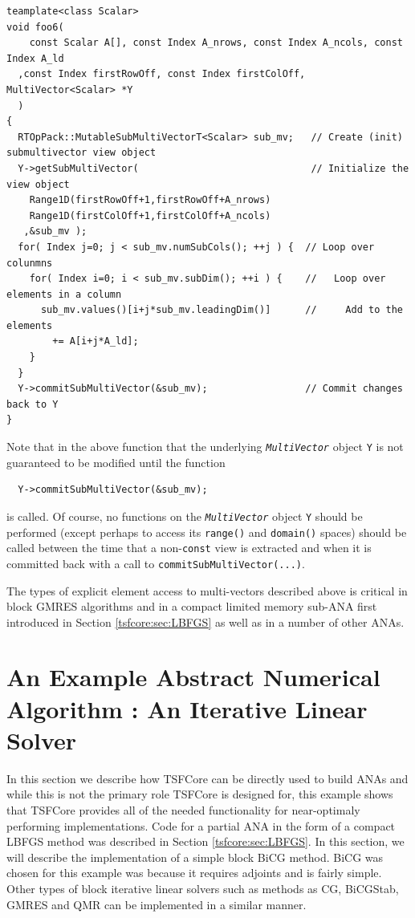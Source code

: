 {\scriptsize\begin{verbatim}
teamplate<class Scalar>
void foo6(
	const Scalar A[], const Index A_nrows, const Index A_ncols, const Index A_ld
  ,const Index firstRowOff, const Index firstColOff, MultiVector<Scalar> *Y
  )
{
  RTOpPack::MutableSubMultiVectorT<Scalar> sub_mv;   // Create (init) submultivector view object
  Y->getSubMultiVector(                              // Initialize the view object
    Range1D(firstRowOff+1,firstRowOff+A_nrows)
    Range1D(firstColOff+1,firstColOff+A_ncols)
   ,&sub_mv );
  for( Index j=0; j < sub_mv.numSubCols(); ++j ) {  // Loop over colunmns
    for( Index i=0; i < sub_mv.subDim(); ++i ) {    //   Loop over elements in a column
      sub_mv.values()[i+j*sub_mv.leadingDim()]      //     Add to the elements
        += A[i+j*A_ld];
    }
  }
  Y->commitSubMultiVector(&sub_mv);                 // Commit changes back to Y
}
\end{verbatim}}

Note that in the above function that the underlying
{}\texttt{\textit{Multi\-Vector}} object {}\texttt{Y} is not
guaranteed to be modified until the function

{\scriptsize\begin{verbatim}
  Y->commitSubMultiVector(&sub_mv);
\end{verbatim}}

{}\noindent{}is called.  Of course, no functions on the
{}\texttt{\textit{Multi\-Vector}} object {}\texttt{Y} should be
performed (except perhaps to access its {}\texttt{range()} and
{}\texttt{domain()} spaces) should be called between the time that a
non-\texttt{const} view is extracted and when it is committed back
with a call to {}\texttt{commit\-Sub\-Multi\-Vector(...)}.

The types of explicit element access to multi-vectors described above
is critical in block GMRES algorithms and in a compact limited memory
sub-ANA first introduced in Section {}\ref{tsfcore:sec:LBFGS} as well
as in a number of other ANAs.

%
\section{An Example Abstract Numerical Algorithm : An Iterative Linear Solver}
\label{tsfcore:sec:ANA_iter_solver_example}
%

In this section we describe how TSFCore can be directly used to build
ANAs and while this is not the primary role TSFCore is designed for,
this example shows that TSFCore provides all of the needed
functionality for near-optimaly performing implementations.  Code for
a partial ANA in the form of a compact LBFGS method was described in
Section {}\ref{tsfcore:sec:LBFGS}.  In this section, we will describe
the implementation of a simple block BiCG
{}\cite{ref:tmpls_for_iter_systems} method.  BiCG was chosen for this
example was because it requires adjoints and is fairly simple.  Other
types of block iterative linear solvers such as methods as CG,
BiCGStab, GMRES and QMR {}\cite{ref:tmpls_for_iter_systems} can be
implemented in a similar manner.

